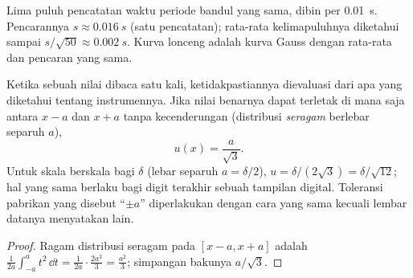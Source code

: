 \begin{omfigure}

{\small Lima puluh pencatatan waktu periode bandul yang sama, dibin per
\qty{0.01}{s}. Pencarannya $s \approx \qty{0.016}{s}$ (satu pencatatan);
rata-rata kelimapuluhnya diketahui sampai $s/\sqrt{50} \approx \qty{0.002}{s}$.
Kurva lonceng adalah kurva Gauss dengan rata-rata dan pencaran yang sama.}
\end{omfigure}

\begin{proposition}\label{prop:b1:units-dimensions:typeB}
Ketika sebuah nilai dibaca satu kali, ketidakpastiannya dievaluasi dari
apa yang diketahui tentang instrumennya. Jika nilai benarnya dapat
terletak di mana saja antara $x - a$ dan $x + a$ tanpa kecenderungan
(distribusi \emph{seragam} berlebar separuh $a$),
\[
u(x) = \frac{a}{\sqrt 3} .
\]
Untuk skala berskala bagi $\delta$ (lebar separuh $a = \delta/2$),
$u = \delta/(2\sqrt3) = \delta/\sqrt{12}$; hal yang sama berlaku bagi
digit terakhir sebuah tampilan digital. Toleransi pabrikan yang
disebut ``$\pm a$'' diperlakukan dengan cara yang sama kecuali lembar
datanya menyatakan lain.
\end{proposition}

\begin{proof}
Ragam distribusi seragam pada $[x - a, x + a]$ adalah
$\frac{1}{2a}\int_{-a}^{a} t^2\,\dd t = \frac{1}{2a}\cdot\frac{2a^3}{3}
= \frac{a^2}{3}$; simpangan bakunya $a/\sqrt3$.
\end{proof}

